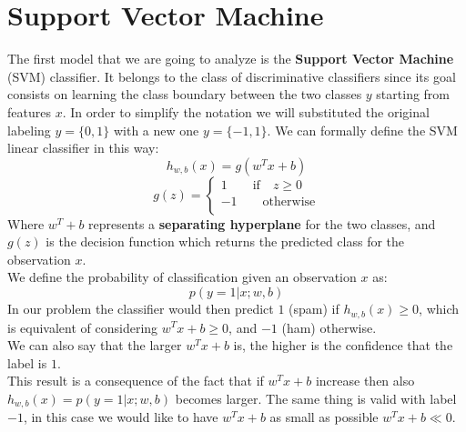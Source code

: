 \documentclass[11pt,a4paper]{article}
\begin{document}
\section{Support Vector Machine}
The first model that we are going to analyze is the \textbf{Support Vector Machine} (SVM) classifier. It belongs to the class of discriminative classifiers since its goal consists on learning the class boundary between the two classes $y$ starting from features $x$. In order to simplify the notation we will substituted the original labeling $y= \{0,1\}$ with a new one $y= \{-1,1\}$.
We can formally define the SVM linear classifier in this way:
$$h_{w,b}(x) = g(w^Tx + b)$$
$$
g(z)=
\begin{cases}
1\qquad \text{if} \quad z \geq 0\\
-1\qquad \text{otherwise}\\
\end{cases}
$$
Where $w^T + b$ represents a \textbf{separating hyperplane} for the two classes, and $g(z)$ is the decision function which returns the predicted class for the observation $x$. \\
We define the probability of classification given an observation $x$ as:
$$p(y = 1 | x; w,b)$$
In our problem the classifier would then predict $1$ (spam) if $h_{w,b}(x) \geq 0$, which is equivalent of considering $w^Tx + b \geq 0$, and $-1$ (ham) otherwise.\\
We can also say that the larger $w^Tx + b$ is, the higher is the confidence that the label is $1$. \\

This result is a consequence of the fact that if $w^Tx + b$ increase then also $h_{w,b}(x)= p(y = 1 | x; w,b)$ becomes larger. The same thing is valid with label $-1$, in this case we would like to have $w^Tx + b$ as small as possible $w^Tx + b \ll 0$.\\
\end{document}
